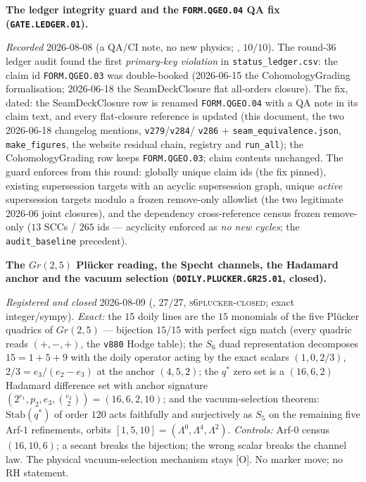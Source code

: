 \documentclass[11pt,a4paper]{article}
\begin{document}
\par\smallskip\noindent\textbf{The ledger integrity guard and
the \texttt{FORM.QGEO.04} QA fix (\texttt{GATE.LEDGER.01}).}
{\sloppy
\emph{Recorded} 2026-08-08 (a QA/CI note, no new physics;
, $10/10$).  The round-36
ledger audit found the first \emph{primary-key violation} in
\texttt{status\_ledger.csv}: the claim id \texttt{FORM.QGEO.03}
was double-booked (2026-06-15 the CohomologyGrading
formalisation; 2026-06-18 the SeamDeckClosure flat all-orders
closure).  The fix, dated: the SeamDeckClosure row is renamed
\texttt{FORM.QGEO.04} with a QA note in its claim text, and
every flat-closure reference is updated (this document, the two
2026-06-18 changelog mentions, \texttt{v279}/\texttt{v284}/%
\texttt{v286} $+$ \texttt{seam\_equivalence.json},
\texttt{make\_figures}, the website residual chain, registry
and \texttt{run\_all}); the CohomologyGrading row keeps
\texttt{FORM.QGEO.03}; claim contents unchanged.  The guard
enforces from this round: globally unique claim ids (the fix
pinned), existing supersession targets with an acyclic
supersession graph, unique \emph{active} supersession targets
modulo a frozen remove-only allowlist (the two legitimate
2026-06 joint closures), and the dependency cross-reference
census frozen remove-only ($13$ SCCs / $265$ ids ---
acyclicity enforced as \emph{no new cycles}; the
\texttt{audit\_baseline} precedent).\par}

\par\smallskip\noindent\textbf{The $Gr(2,5)$ Pl\"ucker reading,
the Specht channels, the Hadamard anchor and the vacuum
selection (\texttt{DOILY.PLUCKER.\allowbreak GR25.01},
closed).}
{\sloppy
\emph{Registered and closed} 2026-08-09
(, $27/27$,
\textsc{s6plucker-closed}; exact integer/sympy).  \emph{Exact:}
the $15$ doily lines are the $15$ monomials of the five
Pl\"ucker quadrics of $Gr(2,5)$ --- bijection $15/15$ with
perfect sign match (every quadric reads $(+,-,+)$, the
\texttt{v880} Hodge table); the $S_6$ duad representation
decomposes $15 = 1 + 5 + 9$ with the doily operator acting by
the exact scalars $(1, 0, 2/3)$, $2/3 = e_3/(e_2 - e_3)$ at the
anchor $(4, 5, 2)$; the $q^{*}$ zero set is a $(16, 6, 2)$
Hadamard difference set with anchor signature $(2^{e_1}, p_2,
e_3, \binom{e_2}{2}) = (16, 6, 2, 10)$; and the
vacuum-selection theorem: $\mathrm{Stab}(q^{*})$ of order $120$
acts faithfully and surjectively as $S_5$ on the remaining five
Arf-$1$ refinements, orbits $[1, 5, 10] = (\Lambda^0,
\Lambda^4, \Lambda^2)$.  \emph{Controls:} Arf-$0$ census
$(16,10,6)$; a secant breaks the bijection; the wrong scalar
breaks the channel law.  The physical vacuum-selection
mechanism stays [O].  No marker move; no RH statement.\par}
\end{document}
